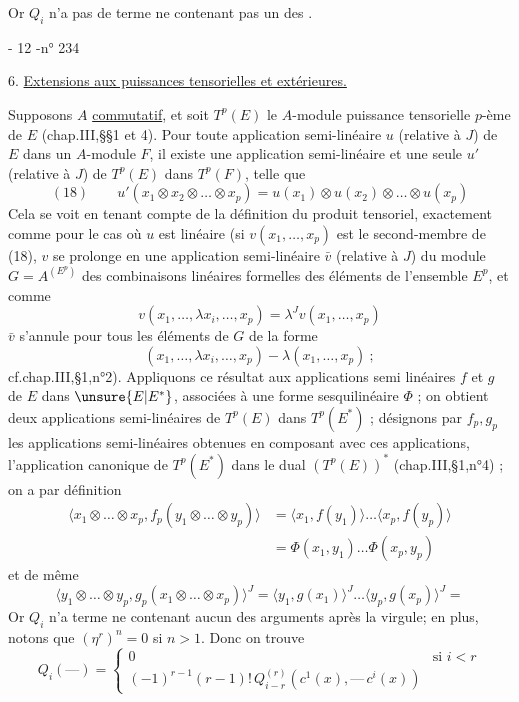 Or $Q_i$ n'a pas de terme ne contenant pas un des .


- 12 -\hfill n° 234

6. \uline{Extensions aux puissances tensorielles et extérieures.}

Supposons $A$ \uline{commutatif}, et soit $T^p(E)$ le $A$-module puissance tensorielle $p$-ème de $E$ (chap.III,\S\S1 et 4). Pour toute application semi-linéaire $u$ (relative à $J$) de $E$ dans un $A$-module $F$, il existe une application semi-linéaire et une seule $u'$ (relative à $J$) de $T^p(E)$ dans $T^p(F)$, telle que
\[
(18)\qquad u'(x_1\otimes x_2\otimes\ldots\otimes x_p)=u(x_1)\otimes u(x_2)\otimes\ldots\otimes u(x_p)
\]
Cela se voit en tenant compte de la définition du produit tensoriel, exactement comme pour le cas où $u$ est linéaire (si $v(x_1,\ldots,x_p)$ est le second-membre de (18), $v$ se prolonge en une application semi-linéaire $\bar v$ (relative à $J$) du module $G=A^{(E^p)}$ des combinaisons linéaires formelles des éléments de l'ensemble $E^p$, et comme
\[
v(x_1,\ldots,\lambda x_i,\ldots,x_p)=\lambda^J v(x_1,\ldots,x_p)
\]
$\bar v$ s'annule pour tous les éléments de $G$ de la forme
\[
(x_1,\ldots,\lambda x_i,\ldots,x_p)-\lambda(x_1,\ldots,x_p)\ ;
\]
cf.chap.III,\S1,n°2). Appliquons ce résultat aux applications semi linéaires $f$ et $g$ de $E$ dans $\unsure{E|E^*}$, associées à une forme sesquilinéaire $\Phi$ ; on obtient deux applications semi-linéaires de $T^p(E)$ dans $T^p(E^*)$ ; désignons par $f_p,g_p$ les applications semi-linéaires obtenues en composant avec ces applications, l'application canonique de $T^p(E^*)$ dans le dual $(T^p(E))^*$ (chap.III,\S1,n°4) ; on a par définition
\[
\begin{aligned}
\langle x_1\otimes\ldots\otimes x_p,f_p(y_1\otimes\ldots\otimes y_p)\rangle
&=\langle x_1,f(y_1)\rangle\ldots\langle x_p,f(y_p)\rangle\\
&=\Phi(x_1,y_1)\ldots\Phi(x_p,y_p)
\end{aligned}
\]
et de même
\[
\langle y_1\otimes\ldots\otimes y_p,g_p(x_1\otimes\ldots\otimes x_p)\rangle^J
=\langle y_1,g(x_1)\rangle^J\ldots\langle y_p,g(x_p)\rangle^J=
\]
Or $Q_i$ n'a  terme ne contenant aucun des arguments après la virgule;
en plus, notons que $(\eta^r)^n=0$ si $n>1$. Donc on trouve
\[
Q_i(\text{---})=\begin{cases}
0&\text{si }i<r\\
(-1)^{r-1}(r-1)!\,Q_{i-r}^{(r)}(c^1(x),\text{---}\,c^i(x))
\end{cases}
\]
